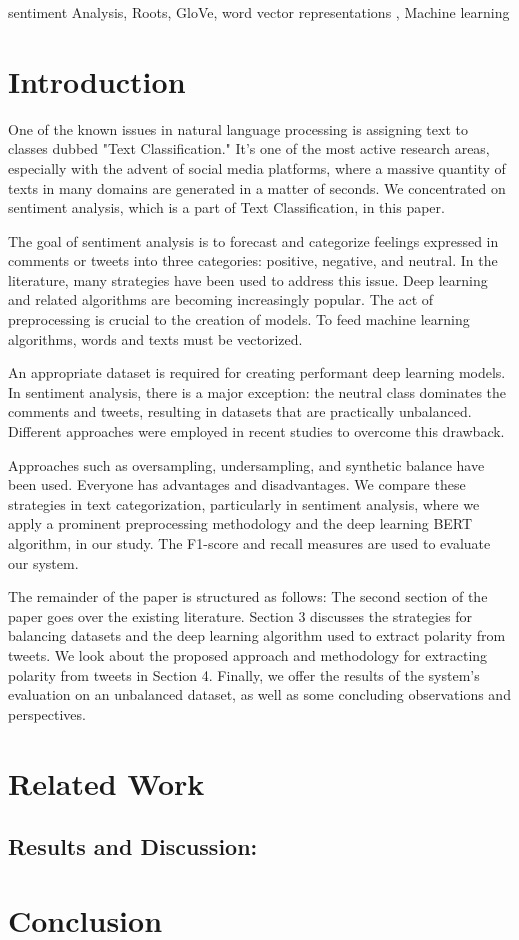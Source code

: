 \documentclass[conference]{IEEEtran}
\begin{document}
\begin{IEEEkeywords}
sentiment Analysis, Roots, GloVe, word vector representations , Machine learning
\end{IEEEkeywords}

\section{Introduction}
One of the known issues in natural language processing is assigning text to classes dubbed "Text Classification."
It's one of the most active research areas, especially with the advent of social media platforms, where a massive quantity of texts in many domains are generated in a matter of seconds.
We concentrated on sentiment analysis, which is a part of Text Classification, in this paper. 

The goal of sentiment analysis is to forecast and categorize feelings expressed in comments or tweets into three categories: positive, negative, and neutral. In the literature, many strategies have been used to address this issue. Deep learning and related algorithms are becoming increasingly popular. The act of preprocessing is crucial to the creation of models. To feed machine learning algorithms, words and texts must be vectorized.
 
An appropriate dataset is required for creating performant deep learning models. In sentiment analysis, there is a major exception: the neutral class dominates the comments and tweets, resulting in datasets that are practically unbalanced. Different approaches were employed in recent studies to overcome this drawback. 

Approaches such as oversampling, undersampling, and synthetic balance have been used. Everyone has advantages and disadvantages. We compare these strategies in text categorization, particularly in sentiment analysis, where we apply a prominent preprocessing methodology and the deep learning BERT algorithm, in our study. The F1-score and recall measures are used to evaluate our system. 

The remainder of the paper is structured as follows:
The second section of the paper goes over the existing literature.
Section 3 discusses the strategies for balancing datasets and the deep learning algorithm used to extract polarity from tweets.
We look about the proposed approach and methodology for extracting polarity from tweets in Section 4.
Finally, we offer the results of the system's evaluation on an unbalanced dataset, as well as some concluding observations and perspectives. 


\section{Related Work}


\subsection{Results and Discussion:}\label{AA}


\section{Conclusion}




%
\end{document}
